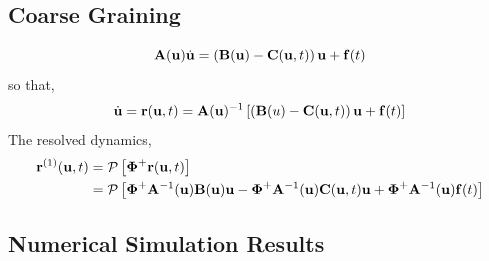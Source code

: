 \subsection{Coarse Graining}

\begin{equation}
    \vA(\vu)\dot{\vu} = \left(\vB(\vu) - \vC(\vu,t)\right)\vu + \vf(t)
\end{equation}
so that,
\begin{equation}
    \dot{\vu} = \vr(\vu,t) = \vA(\vu)^{-1}\left[\left(\vB(u) - \vC(\vu,t)\right)\vu + \vf(t)\right]
\end{equation}
The resolved dynamics,
\begin{align}
    \vr^{(1)}(\vu,t) &= \cP\left[\vPhi^+\vr(\vu,t)\right]\\
    &=\cP\left[\vPhi^+\vA^{-1}(\vu)\vB(\vu)\vu - \vPhi^+\vA^{-1}(\vu)\vC(\vu,t)\vu + \vPhi^+\vA^{-1}(\vu)\vf(t)\right]
\end{align}
\subsection{Numerical Simulation Results}

